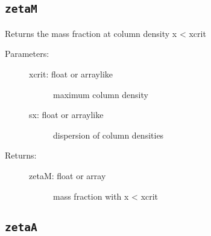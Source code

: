 \documentclass[letterpaper,10pt,english]{sphinxmanual}
\begin{document}
\subsection{\texttt{zetaM}}
\label{fulldoc:zetam}

\begin{fulllineitems}
\label{fulldoc:despotic.winds.pwind_util.zetaM}
Returns the mass fraction at column density x \textless{} xcrit
\begin{description}
\item[{Parameters:}] \leavevmode\begin{description}
\item[{xcrit: float or arraylike}] \leavevmode
maximum column density

\item[{sx: float or arraylike}] \leavevmode
dispersion of column densities

\end{description}

\item[{Returns:}] \leavevmode\begin{description}
\item[{zetaM: float or array}] \leavevmode
mass fraction with x \textless{} xcrit

\end{description}

\end{description}

\end{fulllineitems}



\subsection{\texttt{zetaA}}
\label{fulldoc:zetaa}
\end{document}
